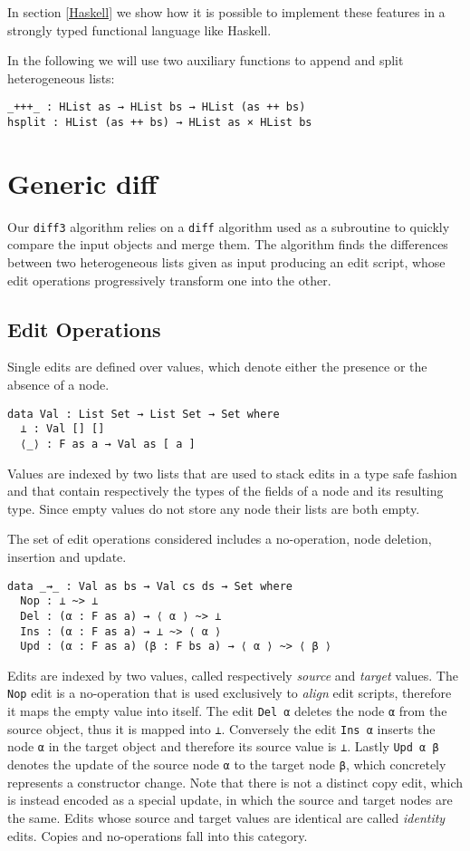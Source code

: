 \documentclass[preprint]{sigplanconf}
\begin{document}
	In section \ref{Haskell} we show how it is possible to implement these 
	features in a strongly typed functional language like Haskell.
	
	In the following we will use two auxiliary functions to append and split 
	heterogeneous lists:
\begin{verbatim}
_+++_ : HList as → HList bs → HList (as ++ bs)
hsplit : HList (as ++ bs) → HList as × HList bs
\end{verbatim}
	
\section{Generic diff}
	Our \texttt{diff3} algorithm relies on a \texttt{diff} algorithm used 
        as a subroutine to quickly compare the input objects and merge them.
	The algorithm finds the differences between two heterogeneous lists given 
	as input producing an edit script, whose edit operations progressively 
	transform one into the other.

	\subsection{Edit Operations}
	Single edits are defined over values, which denote either the presence or 
	the absence of a node.
\begin{verbatim}
data Val : List Set → List Set → Set where
  ⊥ : Val [] []
  ⟨_⟩ : F as a → Val as [ a ] 
\end{verbatim}
	Values are indexed by two lists that are used to stack edits in a type 
	safe fashion and that contain respectively the types of the fields of a node 
	and its resulting type.
	Since empty values do not store any node their lists are both empty.

	The set of edit operations considered includes a no-operation, node 
	deletion, insertion and update.
\begin{verbatim}
data _⇝_ : Val as bs → Val cs ds → Set where
  Nop : ⊥ ~> ⊥
  Del : (α : F as a) → ⟨ α ⟩ ~> ⊥
  Ins : (α : F as a) → ⊥ ~> ⟨ α ⟩
  Upd : (α : F as a) (β : F bs a) → ⟨ α ⟩ ~> ⟨ β ⟩
\end{verbatim}
	Edits are indexed by two values, called respectively 
	\emph{source} and \emph{target} values. The \texttt{Nop} edit is 
	a no-operation that is used exclusively to \emph{align} edit scripts,
	therefore it maps the empty value into itself.
	The edit \texttt{Del α} deletes the node \texttt{α} from the source object, 
	thus it is mapped into \texttt{⊥}. Conversely the edit \texttt{Ins α} 
	inserts the node \texttt{α} in the target object and therefore its source value 
	is 	\texttt{⊥}.
	Lastly \texttt{Upd α β} denotes the update of the source node \texttt{α}
	to the target node \texttt{β}, which concretely represents a 
	constructor change. 
	Note that there is not a distinct copy edit, which is instead encoded as a 
	special	update, in which the source and target nodes are the same.
	Edits whose source and target values are identical are 
	called \emph{identity} edits. Copies and no-operations fall into this
	category.
	
\end{document}
